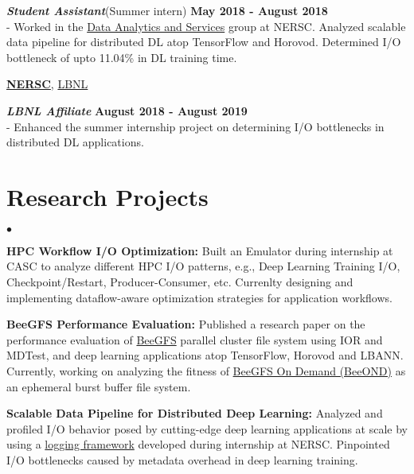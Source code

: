 \documentclass[margin,line]{res}
\newenvironment{list2}{
  \begin{list}{$\bullet$}{%
      \setlength{\itemsep}{0in}
      \setlength{\parsep}{0in} \setlength{\parskip}{0in}
      \setlength{\topsep}{0in} \setlength{\partopsep}{0in} 
      \setlength{\leftmargin}{0.2in}}}{\end{list}}
\begin{document}
\begin{resume}
\vspace{-.4cm}
\textbf{{\em Student Assistant}}(Summer intern) \hfill {\bf May 2018 - August 2018}\\
- Worked in the \href{http://www.nersc.gov/users/data-analytics/}{Data Analytics and Services} group at NERSC. Analyzed scalable data pipeline for distributed DL atop TensorFlow and Horovod. Determined I/O bottleneck of upto 11.04\% in DL training time.

\vspace{-.25cm}
{\bf \href{http://www.nersc.gov/}{NERSC}}, \href{http://www.lbl.gov/}{LBNL}

\vspace{-.4cm}
\textbf{{\em LBNL Affiliate}} \hfill {\bf August 2018 - August 2019}\\
- Enhanced the summer internship project on determining I/O bottlenecks in distributed DL applications.

\vspace*{-.05in}

\section{\sc Research Projects}
\begin{list2}
\item {\bf HPC Workflow I/O Optimization:} Built an Emulator during internship at CASC to analyze different HPC I/O patterns, e.g., Deep Learning Training I/O, Checkpoint/Restart, Producer-Consumer, etc. Currenlty designing and implementing dataflow-aware optimization strategies for application workflows.
\vspace{.1cm}
\item {\bf BeeGFS Performance Evaluation:} Published a research paper on the performance evaluation of \href{https://www.beegfs.io/content/}{BeeGFS} parallel cluster file system using IOR and MDTest, and deep learning applications atop TensorFlow, Horovod and LBANN. Currently, working on analyzing the fitness of \href{http://www.beegfs.io/wiki/BeeOND}{BeeGFS On Demand (BeeOND)} as an ephemeral burst buffer file system.
\vspace{.1cm}
\item {\bf Scalable Data Pipeline for Distributed Deep Learning:} Analyzed and profiled I/O behavior posed by cutting-edge deep learning applications at scale by using a \href{https://github.com/NERSC/DL-Parallel-IO}{logging framework} developed during internship at NERSC. Pinpointed I/O bottlenecks caused by metadata overhead in deep learning training.
\end{list2}


\end{resume}
\end{document}
